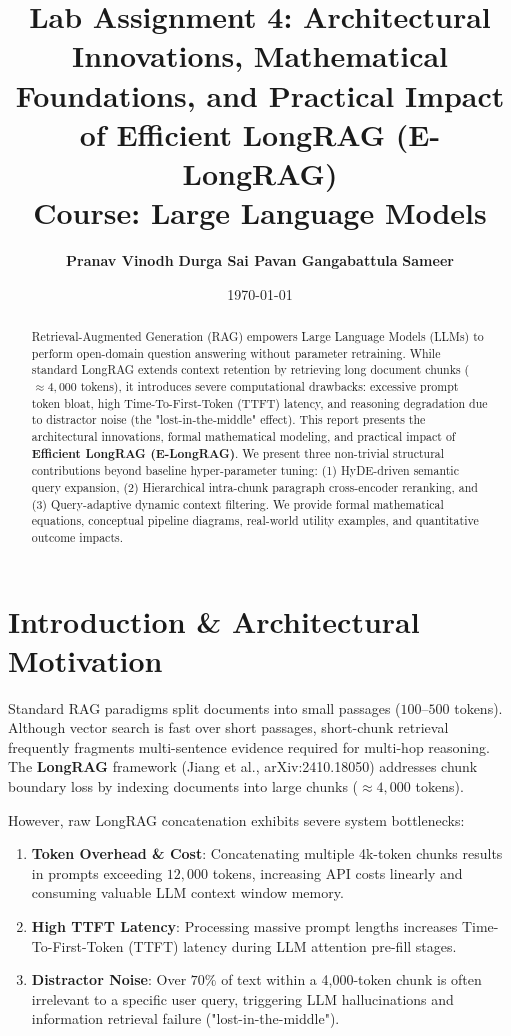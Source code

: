 \documentclass[11pt,a4paper]{article}
\title{\textbf{Lab Assignment 4: Architectural Innovations, Mathematical Foundations, and Practical Impact of Efficient LongRAG (E-LongRAG)}\\
\large\vspace{0.2cm}Course: Large Language Models}
\author{\textbf{Pranav Vinodh} \qquad \textbf{Durga Sai Pavan Gangabattula} \qquad \textbf{Sameer}}
\date{\today}
\begin{document}
\maketitle

\begin{abstract}
Retrieval-Augmented Generation (RAG) empowers Large Language Models (LLMs) to perform open-domain question answering without parameter retraining. While standard LongRAG extends context retention by retrieving long document chunks ($\approx 4,000$ tokens), it introduces severe computational drawbacks: excessive prompt token bloat, high Time-To-First-Token (TTFT) latency, and reasoning degradation due to distractor noise (the "lost-in-the-middle" effect). This report presents the architectural innovations, formal mathematical modeling, and practical impact of \textbf{Efficient LongRAG (E-LongRAG)}. We present three non-trivial structural contributions beyond baseline hyper-parameter tuning: (1) HyDE-driven semantic query expansion, (2) Hierarchical intra-chunk paragraph cross-encoder reranking, and (3) Query-adaptive dynamic context filtering. We provide formal mathematical equations, conceptual pipeline diagrams, real-world utility examples, and quantitative outcome impacts.
\end{abstract}

\section{Introduction \& Architectural Motivation}
Standard RAG paradigms split documents into small passages ($100$--$500$ tokens). Although vector search is fast over short passages, short-chunk retrieval frequently fragments multi-sentence evidence required for multi-hop reasoning. The \textbf{LongRAG} framework (Jiang et al., arXiv:2410.18050) addresses chunk boundary loss by indexing documents into large chunks ($\approx 4,000$ tokens).

However, raw LongRAG concatenation exhibits severe system bottlenecks:
\begin{enumerate}
    \item \textbf{Token Overhead \& Cost}: Concatenating multiple 4k-token chunks results in prompts exceeding $12,000$ tokens, increasing API costs linearly and consuming valuable LLM context window memory.
    \item \textbf{High TTFT Latency}: Processing massive prompt lengths increases Time-To-First-Token (TTFT) latency during LLM attention pre-fill stages.
    \item \textbf{Distractor Noise}: Over $70\%$ of text within a 4,000-token chunk is often irrelevant to a specific user query, triggering LLM hallucinations and information retrieval failure ("lost-in-the-middle").
\end{enumerate}
\end{document}
